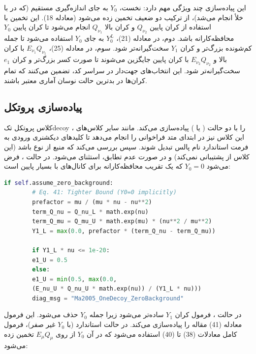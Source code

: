 این پیاده‌سازی چند ویژگی مهم دارد: نخست، $Y_0$ به جای اندازه‌گیری مستقیم (که در  با  خلأ انجام می‌شد)، از ترکیب دو  ضعیف تخمین زده می‌شود (معادله 18). این تخمین با استفاده از کران پایین $Q_{\nu_2}$ و کران بالا $Q_{\nu_1}$ انجام می‌شود تا کران پایین $Y_0$ محافظه‌کارانه باشد. دوم، در معادله (21)، $Y_0^L$ به جای $Y_0$ استفاده می‌شود تا جمله کم‌شونده بزرگ‌تر و کران $Y_1$ سخت‌گیرانه‌تر شود. سوم، در معادله (25)، $E_{\nu_1} Q_{\nu_1}$ با کران بالا و $E_{\nu_2} Q_{\nu_2}$ با کران پایین جایگزین می‌شوند تا صورت کسر بزرگ‌تر و کران $e_1$ سخت‌گیرانه‌تر شود. این انتخاب‌های جهت‌دار در سراسر کد، تضمین می‌کنند که تمام کران‌ها در بدترین حالت نوسان آماری معتبر باشند.

\subsection{پیاده‌سازی پروتکل }

کلاس  پروتکل تک‌‌‌decoy را با دو حالت ( یا ) پیاده‌سازی می‌کند. مانند سایر کلاس‌های ، این کلاس نیز در ابتدای متد  فراخوانی  را انجام می‌دهد تا کلیدهای دیکشنری ورودی به فرمت استاندارد نام پالس تبدیل شوند. سپس بررسی می‌کند که منبع از نوع  باشد (این کلاس از  پشتیبانی نمی‌کند) و در صورت عدم تطابق، استثنای   می‌شود. در حالت ، فرض می‌شود $Y_0 = 0$ که یک تقریب محافظه‌کارانه برای کانال‌های با  بسیار پایین است:

\begin{LTR}
	\begin{lstlisting}[language=Python]
		if self.assume_zero_background:
		# Eq. 41: Tighter Bound (Y0=0 implicitly)
		prefactor = mu / (mu * nu - nu**2)
		term_Q_nu = Q_nu_L * math.exp(nu)
		term_Q_mu = Q_mu_U * math.exp(mu) * (nu**2 / mu**2)
		Y1_L = max(0.0, prefactor * (term_Q_nu - term_Q_mu))
		
		if Y1_L * nu <= 1e-20:
		e1_U = 0.5
		else:
		e1_U = min(0.5, max(0.0,
		(E_nu_U * Q_nu_U * math.exp(nu)) / (Y1_L * nu)))
		diag_msg = "Ma2005_OneDecoy_ZeroBackground"
	\end{lstlisting}
\end{LTR}

در حالت ، فرمول کران $Y_1$ ساده‌تر می‌شود زیرا جمله $Y_0$ حذف می‌شود. این فرمول معادله (41) مقاله را پیاده‌سازی می‌کند. در حالت استاندارد (با $Y_0$ غیر صفر)، فرمول کامل معادلات (38) تا (40) استفاده می‌شود که در آن $Y_0$ از روی $E_\mu Q_\mu$ تخمین زده می‌شود:

